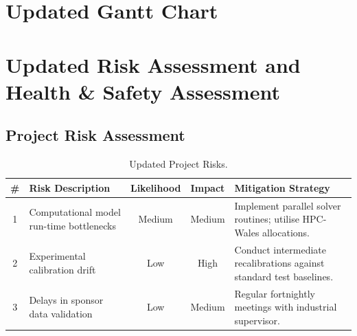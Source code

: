 \documentclass[year2]{../idcore-ar}
\begin{document}




\newpage
\section{Updated Gantt Chart}

\begin{center}
  \vspace{1cm}
\end{center}


\newpage
\section{Updated Risk Assessment and Health \& Safety Assessment}

\subsection{Project Risk Assessment}

\begin{table}[htbp]
\centering
\small
\renewcommand{\arraystretch}{1.3}
\begin{tabularx}{\linewidth}{|c|>{\raggedright\arraybackslash}p{4cm}|c|c|>{\raggedright\arraybackslash}X|}
  \hline
  \rowcolor{idcorelight}
  \textbf{\#} & \textbf{Risk Description} & \textbf{Likelihood} & \textbf{Impact} & \textbf{Mitigation Strategy} \\ \hline
  1 & Computational model run-time bottlenecks & Medium & Medium & Implement parallel solver routines; utilise HPC-Wales allocations. \\ \hline
  2 & Experimental calibration drift & Low & High & Conduct intermediate recalibrations against standard test baselines. \\ \hline
  3 & Delays in sponsor data validation & Low & Medium & Regular fortnightly meetings with industrial supervisor. \\ \hline
\end{tabularx}
\caption{Updated Project Risks.}
\end{table}
\end{document}
